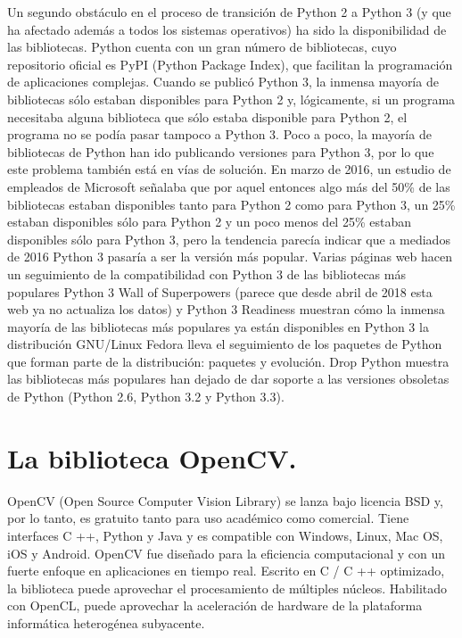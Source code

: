 \documentclass[12pt]{article}
\begin{document}
Un segundo obstáculo en el proceso de transición de Python 2 a Python 3 (y que ha afectado además a todos los sistemas operativos) ha sido la disponibilidad de las bibliotecas.
Python cuenta con un gran número de bibliotecas, cuyo repositorio oficial es PyPI (Python Package Index), que facilitan la programación de aplicaciones complejas. Cuando se publicó Python 3, la inmensa mayoría de bibliotecas sólo estaban disponibles para Python 2 y, lógicamente, si un programa necesitaba alguna biblioteca que sólo estaba disponible para Python 2, el programa no se podía pasar tampoco a Python 3.
Poco a poco, la mayoría de bibliotecas de Python han ido publicando versiones para Python 3, por lo que este problema también está en vías de solución.
En marzo de 2016, un estudio de empleados de Microsoft señalaba que por aquel entonces algo más del 50\% de las bibliotecas estaban disponibles tanto para Python 2 como para Python 3, un 25\% estaban disponibles sólo para Python 2 y un poco menos del 25\% estaban disponibles sólo para Python 3, pero la tendencia parecía indicar que a mediados de 2016 Python 3 pasaría a ser la versión más popular.
Varias páginas web hacen un seguimiento de la compatibilidad con Python 3 de las bibliotecas más populares
Python 3 Wall of Superpowers (parece que desde abril de 2018 esta web ya no actualiza los datos) y Python 3 Readiness muestran cómo la inmensa mayoría de las bibliotecas más populares ya están disponibles en Python 3
la distribución GNU/Linux Fedora lleva el seguimiento de los paquetes de Python que forman parte de la distribución: paquetes y evolución.
Drop Python muestra las bibliotecas más populares han dejado de dar soporte a las versiones obsoletas de Python (Python 2.6, Python 3.2 y Python 3.3). \cite{BartolomeWebSite}


\section{La biblioteca OpenCV.}

OpenCV (Open Source Computer Vision Library) se lanza bajo licencia BSD y, por lo tanto, es gratuito tanto para uso académico como comercial. Tiene interfaces C ++, Python y Java y es compatible con Windows, Linux, Mac OS, iOS y Android. OpenCV fue diseñado para la eficiencia computacional y con un fuerte enfoque en aplicaciones en tiempo real. Escrito en C / C ++ optimizado, la biblioteca puede aprovechar el procesamiento de múltiples núcleos. Habilitado con OpenCL, puede aprovechar la aceleración de hardware de la plataforma informática heterogénea subyacente.
\end{document}
